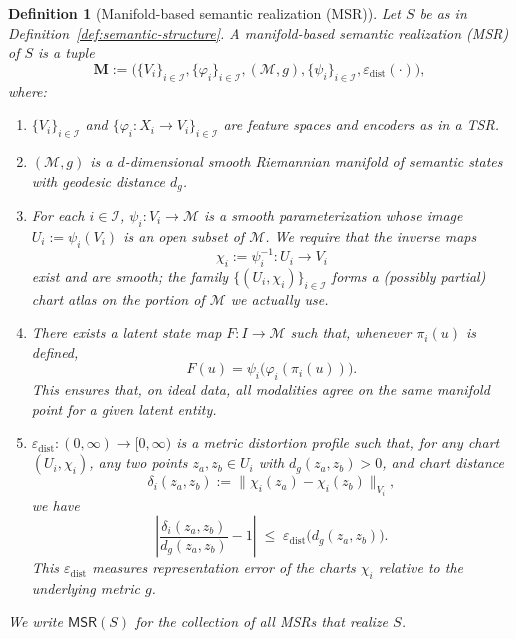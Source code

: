 \documentclass[11pt]{article}
\newcommand{\MSR}{\mathsf{MSR}}
\newtheorem{definition}{Definition}
\begin{document}
\begin{definition}[Manifold-based semantic realization (MSR)]
\label{def:msr}
Let $S$ be as in Definition~\ref{def:semantic-structure}.
A \emph{manifold-based semantic realization} (MSR) of $S$ is a tuple
\[
\mathbf{M}
:=
\bigl(
\{V_i\}_{i\in\mathcal{I}},
\{\varphi_i\}_{i\in\mathcal{I}},
(\mathcal{M}, g),
\{\psi_i\}_{i\in\mathcal{I}},
\varepsilon_{\mathrm{dist}}(\cdot)
\bigr),
\]
where:
\begin{enumerate}[label=\textnormal{(\roman*)}, leftmargin=*]
\item $\{V_i\}_{i\in\mathcal{I}}$ and $\{\varphi_i : X_i\to V_i\}_{i\in\mathcal{I}}$ are
feature spaces and encoders as in a TSR.

\item $(\mathcal{M}, g)$ is a $d$-dimensional smooth Riemannian manifold of \emph{semantic
states} with geodesic distance $d_g$.

\item For each $i\in\mathcal{I}$, $\psi_i : V_i \to \mathcal{M}$ is a smooth \emph{parameterization}
whose image $U_i := \psi_i(V_i)$ is an open subset of $\mathcal{M}$. We require that the
inverse maps
\[
\chi_i := \psi_i^{-1} : U_i \to V_i
\]
exist and are smooth; the family $\{(U_i,\chi_i)\}_{i\in\mathcal{I}}$ forms a (possibly
partial) chart atlas on the portion of $\mathcal{M}$ we actually use.

\item There exists a \emph{latent state map} $F : I \to \mathcal{M}$ such that, whenever
$\pi_i(u)$ is defined,
\[
F(u) = \psi_i\bigl( \varphi_i(\pi_i(u)) \bigr).
\]
This ensures that, on ideal data, all modalities agree on the same manifold point
for a given latent entity.

\item $\varepsilon_{\mathrm{dist}} : (0,\infty)\to [0,\infty)$ is a \emph{metric distortion
profile} such that, for any chart $(U_i,\chi_i)$, any two points $z_a,z_b\in U_i$ with
$d_g(z_a,z_b)>0$, and chart distance
\[
\delta_i(z_a,z_b)
:=
\bigl\| \chi_i(z_a) - \chi_i(z_b) \bigr\|_{V_i},
\]
we have
\begin{equation}
\label{eq:msr-distortion}
\left|
\frac{\delta_i(z_a,z_b)}{d_g(z_a,z_b)} - 1
\right|
\;\le\;
\varepsilon_{\mathrm{dist}}\bigl( d_g(z_a,z_b) \bigr).
\end{equation}
This $\varepsilon_{\mathrm{dist}}$ measures \emph{representation error} of the charts
$\chi_i$ relative to the underlying metric $g$.
\end{enumerate}
We write $\MSR(S)$ for the collection of all MSRs that realize $S$.
\end{definition}
\end{document}
